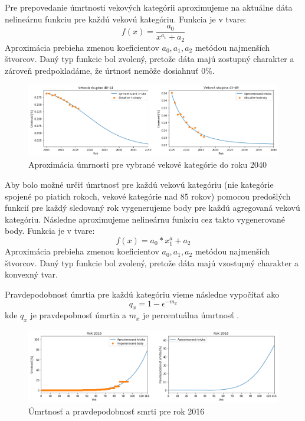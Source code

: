 \documentclass[a4paper, 11pt]{article}
\begin{document}
Pre prepovedanie úmrtnosti vekových kategórii aproximujeme na aktuálne dáta nelineárnu funkciu pre každú vekovú kategóriu. Funkcia je v tvare:
$$f(x)=\frac{a_0}{x^{a_1} + a_2}$$
Aproximácia prebieha zmenou koeficientov $a_0, a_1, a_2$ metódou najmenších štvorcov\cite{spline}. Daný typ funkcie bol zvolený, pretože dáta majú zostupný charakter a zároveň predpokladáme, že úrtnosť nemôže dosiahnuť 0\%.
\begin{figure}[H]
\centering
\includegraphics[width=1\textwidth]{exp_1}
\caption{Aproximácia úmrnosti pre vybrané vekové kategórie do roku 2040}
\end{figure}

Aby bolo možné určiť úmrtnosť pre každú vekovú kategóriu (nie kategórie spojené po piatich rokoch, vekové kategórie nad 85 rokov) pomocou predošlých funkcií pre každý sledovaný rok vygenerujeme body pre každú agregovaná vekovú kategóriu. Následne aproximujeme nelineárnu funkciu cez takto vygenerované body. Funkcia je v tvare:
$$f(x) = a_0 * x^a_1 + a_2$$
Aproximácia prebieha zmenou koeficientov $a_0, a_1, a_2$ metódou najmenších štvorcov. Daný typ funkcie bol zvolený, pretože dáta majú vzostupný charakter a konvexný tvar.

Pravdepodobnosť úmrtia pre každú kategóriu vieme následne vypočítať ako 
$$q_x = 1 - \epsilon^{-m_x} $$
kde $q_x$ je pravdepobnosť úmrtia a $m_x$ je percentuálna úmrtnosť \cite{prob}.
\begin{figure}[H]
\centering
\includegraphics[width=1\textwidth]{exp_2}
\caption{Úmrtnosť a pravdepodobnosť smrti pre rok 2016}
\end{figure}
\end{document}
